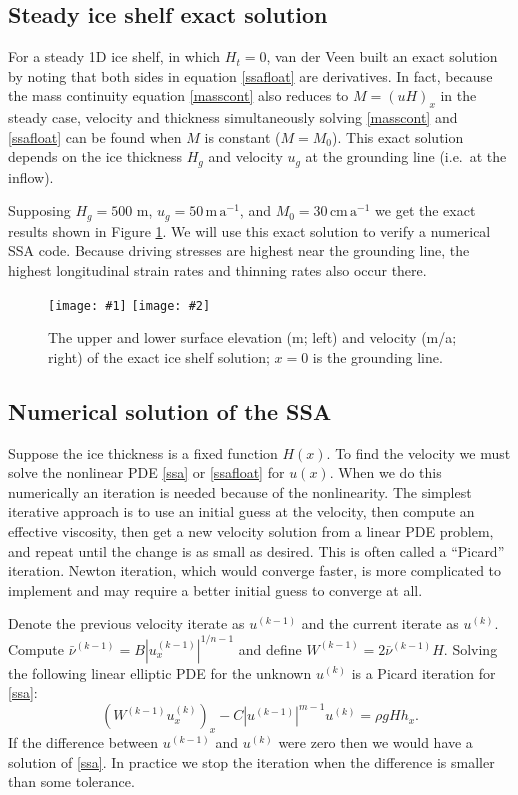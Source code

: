 \documentclass[letterpaper,final,12pt,reqno]{amsart}
\newcommand{\twofigsizes}[5]{
\begin{figure}[ht]
\centering
\texttt{[image: \#1]} \quad
\texttt{[image: \#2]}
\caption{#3}
\label{fig:#1}
\end{figure}}
\newcommand{\twofig}[3]{\twofigsizes{#1}{#2}{#3}{2.5in}{2.5in}}
\begin{document}
\subsection*{Steady ice shelf exact solution}  For a steady 1D ice shelf, in which $H_t=0$, van der Veen \cite{vanderVeen83} built an exact solution by noting that both sides in equation \eqref{ssafloat} are derivatives.  In fact, because the mass continuity equation \eqref{masscont} also reduces to $M=(uH)_x$ in the steady case, velocity and thickness simultaneously solving \eqref{masscont} and \eqref{ssafloat} can be found when $M$ is constant ($M=M_0$).  This exact solution depends on the ice thickness $H_g$ and velocity $u_g$ at the grounding line (i.e.~at the inflow).

Supposing $H_g=500$ m, $u_g = 50 \,\text{m}\,\text{a}^{-1}$, and $M_0=30 \,\text{cm}\,\text{a}^{-1}$ we get the exact results shown in Figure \ref{fig:steadyshelfprofile}.  We will use this exact solution to verify a numerical SSA code.  Because driving stresses are highest near the grounding line, the highest longitudinal strain rates and thinning rates also occur there.

\twofig{steadyshelfprofile}{steadyshelfvelocity}{The upper and lower surface elevation (m; left) and velocity (m/a; right) of the exact ice shelf solution; $x=0$ is the grounding line.}

\subsection*{Numerical solution of the SSA}  Suppose the ice thickness is a fixed function $H(x)$.  To find the velocity we must solve the nonlinear PDE \eqref{ssa} or \eqref{ssafloat} for $u(x)$.  When we do this numerically an iteration is needed because of the nonlinearity.  The simplest iterative approach is to use an initial guess at the velocity, then compute an effective viscosity, then get a new velocity solution from a linear PDE problem, and repeat until the change is as small as desired.  This is often called a ``Picard'' iteration.  Newton iteration, which would converge faster, is more complicated to implement and may require a better initial guess to converge at all.

Denote the previous velocity iterate as $u^{(k-1)}$ and the current iterate as $u^{(k)}$.  Compute $\bar \nu^{(k-1)} = B |u^{(k-1)}_x|^{1/n-1}$ and define $W^{(k-1)} = 2 \bar \nu^{(k-1)} H$.  Solving the following linear elliptic PDE for the unknown $u^{(k)}$ is a Picard iteration for \eqref{ssa}:
\begin{equation}
   \left(W^{(k-1)} u^{(k)}_x\right)_x - C |u^{(k-1)}|^{m-1} u^{(k)} = \rho g H h_x. \label{picardssa}
\end{equation}
If the difference between $u^{(k-1)}$ and $u^{(k)}$ were zero then we would have a solution of \eqref{ssa}.  In practice we stop the iteration when the difference is smaller than some tolerance.
\end{document}
